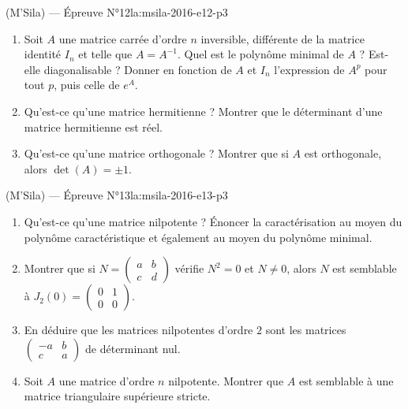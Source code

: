 \begin{problem}{(M'Sila) — Épreuve N°12}{la:msila-2016-e12-p3}
\begin{enumerate}
\item Soit $A$ une matrice carrée d'ordre $n$ inversible, différente de la matrice
      identité $I_n$ et telle que $A = A^{-1}$. Quel est le polynôme minimal de $A$ ?
      Est-elle diagonalisable ? Donner en fonction de $A$ et $I_n$ l'expression de
      $A^p$ pour tout $p$, puis celle de $e^A$.
\item Qu'est-ce qu'une matrice hermitienne ? Montrer que le déterminant d'une matrice
      hermitienne est réel.
\item Qu'est-ce qu'une matrice orthogonale ? Montrer que si $A$ est orthogonale,
      alors $\det(A) = \pm 1$.
\end{enumerate}

\end{problem}

\newpage

\begin{problem}{(M'Sila) — Épreuve N°13}{la:msila-2016-e13-p3}
\begin{enumerate}
\item Qu'est-ce qu'une matrice nilpotente ? Énoncer la caractérisation au moyen du
      polynôme caractéristique et également au moyen du polynôme minimal.
\item Montrer que si $N = \begin{pmatrix} a & b \\ c & d \end{pmatrix}$ vérifie
      $N^2 = 0$ et $N \ne 0$, alors $N$ est semblable à
      $J_2(0) = \begin{pmatrix} 0 & 1 \\ 0 & 0 \end{pmatrix}$.
\item En déduire que les matrices nilpotentes d'ordre $2$ sont les matrices
      $\begin{pmatrix} -a & b \\ c & a \end{pmatrix}$ de déterminant nul.
\item Soit $A$ une matrice d'ordre $n$ nilpotente. Montrer que $A$ est semblable à
      une matrice triangulaire supérieure stricte.
\end{enumerate}

\end{problem}
